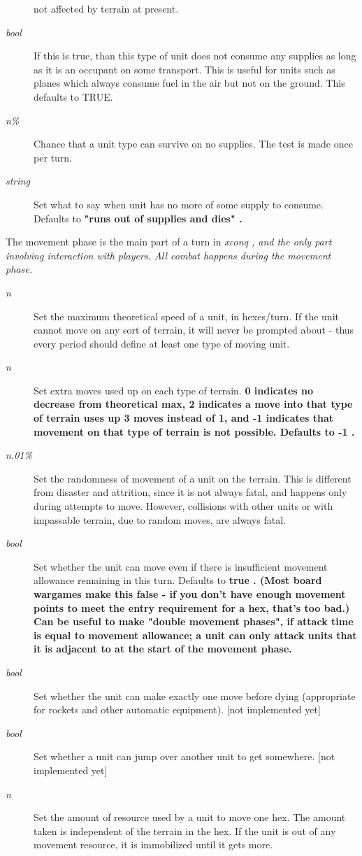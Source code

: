 \begin{description}
not affected by terrain at present.
\item[{%
\it bool}]
If this is true, than this type of unit does not consume any supplies
as long as it is an occupant on some transport.  This is useful for
units such as planes which always consume fuel in the air but not on
the ground.  This defaults to TRUE.
\item[{%
\it n\%}]
Chance that a unit type can survive on no supplies.  The test is made once
per turn.
\item[{%
\it string}]
Set what to say when unit has no more of some supply to consume.
Defaults to %
\bf "runs out of supplies and dies"\rm%
.
\end{description}\par\noindent
The movement phase is the main part of a turn in %
\it xconq\rm%
, and the only part
involving interaction with players.  All combat happens during the movement
phase.
\begin{description}
\item[{%
\it n}]
Set the maximum theoretical speed of a unit, in hexes/turn.
If the unit cannot move on any sort of terrain, it will never be prompted
about - thus every period should define at least one type of moving unit.
\item[{%
\it n}]
Set extra moves used up on each type of terrain. %
\bf 0 \rm%
indicates no
decrease from theoretical max, %
\bf 2 \rm%
indicates a move into that type
of terrain uses up 3 moves instead of 1, and %
\bf -1 \rm%
indicates that
movement on that type of terrain is not possible.
Defaults to %
\bf -1\rm%
.
\item[{%
\it n.01\%}]
Set the randomness of movement of a unit on the terrain.  This is different
from disaster and attrition, since it is not always fatal, and happens only
during attempts to move.  However, collisions with other units or with
impassable terrain, due to random moves, are always fatal.
\item[{%
\it bool}]
Set whether the unit can move even if there is insufficient movement
allowance remaining in this turn.  Defaults to %
\bf true\rm%
.
(Most board wargames make this false - if you don't have enough movement
points to meet the entry requirement for a hex, that's too bad.)
Can be useful to make "double movement phases", if
attack time is equal to movement allowance; a unit can only attack units
that it is adjacent to at the start of the movement phase.
\item[{%
\it bool}]
Set whether the unit can make exactly one move before dying (appropriate
for rockets and other automatic equipment). [not implemented yet]
\item[{%
\it bool}]
Set whether a unit can jump over another unit to get somewhere. [not implemented yet]
\item[{%
\it n}]
Set the amount of resource used by a unit to move one hex.
The amount taken is independent of the terrain in the hex.
If the unit is out of any movement resource, it is immobilized
until it gets more.
\end{description}\par\noindent
